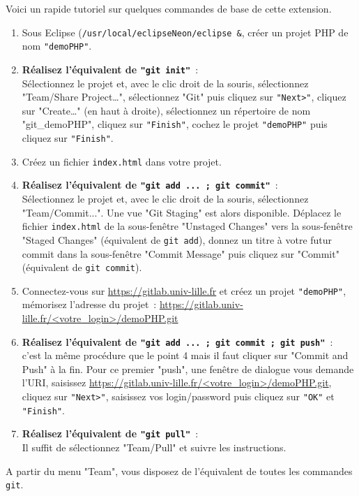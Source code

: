 \documentclass[final, a4paper, openbib, ]{article}
\begin{document}
Voici un rapide tutoriel sur quelques commandes de base de cette extension.
\begin{enumerate}
	\item Sous Eclipse (\texttt{/usr/local/eclipseNeon/eclipse \&}, créer un projet PHP de nom \texttt{"demoPHP"}.
	\item {\bf Réalisez l'équivalent de \texttt{"git init"}}~:\\
	Sélectionnez le projet et, avec le clic droit de la souris, sélectionnez "Team/Share Project\ldots", sélectionnez "Git" puis cliquez sur \texttt{"Next>"}, cliquez sur "Create\ldots" (en haut à droite), sélectionnez un répertoire de nom "git\_demoPHP", cliquez sur \texttt{"Finish"}, cochez le projet \texttt{"demoPHP"} puis cliquez sur \texttt{"Finish"}.
	\item Créez un fichier \texttt{index.html} dans votre projet.
	\item {\bf Réalisez l'équivalent de \texttt{"git add ... ; git commit"}}~:\\
	Sélectionnez le projet et, avec le clic droit de la souris, sélectionnez "Team/Commit...". Une vue "Git Staging" est alors disponible. Déplacez le fichier \texttt{index.html} de la sous-fenêtre "Unstaged Changes" vers la sous-fenêtre "Staged Changes" (équivalent de \texttt{git add}), donnez un titre à votre futur commit dans la sous-fenêtre "Commit Message" puis cliquez sur "Commit" (équivalent de \texttt{git commit}).
	\item Connectez-vous sur \url{https://gitlab.univ-lille.fr} et créez un projet \texttt{"demoPHP"}, mémorisez l'adresse du projet~: \url{https://gitlab.univ-lille.fr/<votre_login>/demoPHP.git}
	\item {\bf Réalisez l'équivalent de \texttt{"git add ... ; git commit ; git push"}}~:\\
	c'est la même procédure que le point 4 mais il faut cliquer sur "Commit and Push" à la fin. Pour ce premier "push", une fenêtre de dialogue vous demande l'URI, saisissez \url{https://gitlab.univ-lille.fr/<votre_login>/demoPHP.git}, cliquez sur \texttt{"Next>"}, saisissez vos login/password puis cliquez sur \texttt{"OK"} et \texttt{"Finish"}.
	\item {\bf Réalisez l'équivalent de \texttt{"git pull"}}~:\\
	Il suffit de sélectionnez "Team/Pull" et suivre les instructions.
\end{enumerate}

A partir du menu "Team", vous disposez de l'équivalent de toutes les commandes \texttt{git}.
\end{document}
